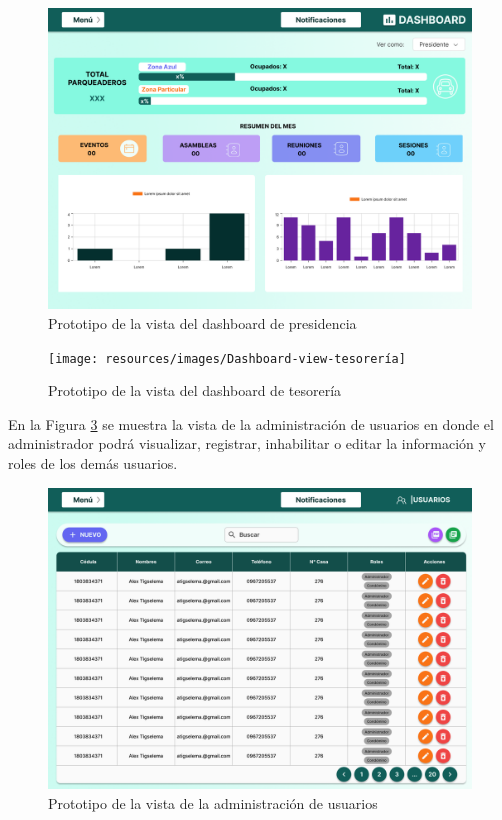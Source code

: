 \begin{figure}[H]
    \centering
    \includegraphics[width=1\textwidth]{resources/images/Dashboard-view-presidente}
    \caption{Prototipo de la vista del dashboard de presidencia}
    \label{fig:dashboard-presidente}
\end{figure}

\begin{figure}[H]
    \centering
    \texttt{[image: resources/images/Dashboard-view-tesorería]}
    \caption{Prototipo de la vista del dashboard de tesorería}
    \label{fig:dashboard-tesorera}
\end{figure}

En la Figura \ref{fig:usuarios} se muestra la vista de la administración de usuarios en donde el administrador podrá visualizar, registrar, inhabilitar o editar la información y roles de los demás usuarios.

\begin{figure}[H]
    \centering
    \includegraphics[width=1\textwidth]{resources/images/usuarios}
    \caption{Prototipo de la vista de la administración de usuarios}
    \label{fig:usuarios}
\end{figure}

